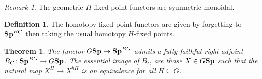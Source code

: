 \documentclass[letterpaper]{article}
\theoremstyle{definition}
\newtheorem{definition}{Definition}[section]
\theoremstyle{remark}
\newtheorem{remark}{Remark}
\theoremstyle{plain}
\newtheorem{theorem}{Theorem}
\begin{document}
\begin{remark}
		The geometric $H$-fixed point functors are symmetric monoidal.
\end{remark}

\begin{definition}
		The homotopy fixed point functors are given by forgetting to $\mathbf{Sp}^{BG}$ then taking the usual homotopy $H$-fixed points.
\end{definition}

\begin{theorem}
		The functor $G\mathbf{Sp}\rightarrow\mathbf{Sp}^{BG}$ admits a fully faithful right adjoint $B_G\colon\mathbf{Sp}^{BG}\rightarrow G\mathbf{Sp}$. The essential image of $B_G$ are those $X\in G\mathbf{Sp}$ such that the natural map $X^H\rightarrow X^{hH}$ is an equivalence for all $H\subseteq G$.
\end{theorem}
\end{document}
